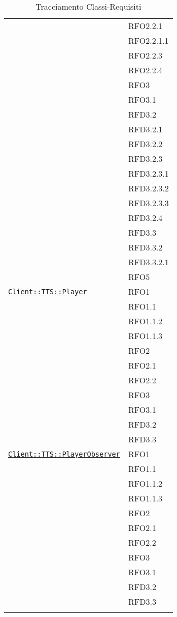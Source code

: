 \begin{longtable}{|>{\centering}m{10cm}|m{3cm}<{\centering}|}
& RFO2.2.1\\
& RFO2.2.1.1\\
& RFO2.2.3\\
& RFO2.2.4\\
& RFO3\\
& RFO3.1\\
& RFD3.2\\
& RFD3.2.1\\
& RFD3.2.2\\
& RFD3.2.3\\
& RFD3.2.3.1\\
& RFD3.2.3.2\\
& RFD3.2.3.3\\
& RFD3.2.4\\
& RFD3.3\\
& RFD3.3.2\\
& RFD3.3.2.1\\
& RFO5\\ \hline

\hyperref[Client::TTS::Player]{\texttt{Client::TTS::Player}} & RFO1\\
& RFO1.1\\
& RFO1.1.2\\
& RFO1.1.3\\
& RFO2\\
& RFO2.1\\
& RFO2.2\\
& RFO3\\
& RFO3.1\\
& RFD3.2\\
& RFD3.3\\ \hline

\hyperref[Client::TTS::PlayerObserver]{\texttt{Client::TTS::PlayerObserver}} & RFO1\\
& RFO1.1\\
& RFO1.1.2\\
& RFO1.1.3\\
& RFO2\\
& RFO2.1\\
& RFO2.2\\
& RFO3\\
& RFO3.1\\
& RFD3.2\\
& RFD3.3\\ \hline

\caption[Tracciamento Classi-Requisiti]{Tracciamento Classi-Requisiti}
\label{tabella:class-requi}
\end{longtable}
\clearpage
